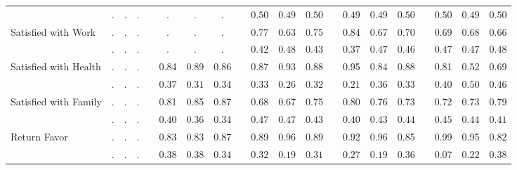 \begin{landscape}
\begin{center}
{\begin{longtable}{L{5cm} c c c p{.5cm} c c c p{.5cm} c c c p{.5cm} c c c p{.5cm} c c c}
& $\mathit{        .}$ & $\mathit{        .}$ & $\mathit{        .}$ & & $\mathit{        .}$ & $\mathit{        .}$ & $\mathit{        .}$ & & $\mathit{     0.50}$ & $\mathit{     0.49}$ & $\mathit{     0.50}$ & & $\mathit{     0.49}$ & $\mathit{     0.49}$ & $\mathit{     0.50}$ & & $\mathit{     0.50}$ & $\mathit{     0.49}$ & $\mathit{     0.50}$ \\[1.6em]
Satisfied with Work & . &         . &         . & &         . &         . &         . & &      0.77 &      0.63 &      0.75 & &      0.84 &      0.67 &      0.70 & &      0.69 &      0.68 &      0.66 \\*
& $\mathit{        .}$ & $\mathit{        .}$ & $\mathit{        .}$ & & $\mathit{        .}$ & $\mathit{        .}$ & $\mathit{        .}$ & & $\mathit{     0.42}$ & $\mathit{     0.48}$ & $\mathit{     0.43}$ & & $\mathit{     0.37}$ & $\mathit{     0.47}$ & $\mathit{     0.46}$ & & $\mathit{     0.47}$ & $\mathit{     0.47}$ & $\mathit{     0.48}$ \\[1.6em]
Satisfied with Health & . &         . &         . & &      0.84 &      0.89 &      0.86 & &      0.87 &      0.93 &      0.88 & &      0.95 &      0.84 &      0.88 & &      0.81 &      0.52 &      0.69 \\*
& $\mathit{        .}$ & $\mathit{        .}$ & $\mathit{        .}$ & & $\mathit{     0.37}$ & $\mathit{     0.31}$ & $\mathit{     0.34}$ & & $\mathit{     0.33}$ & $\mathit{     0.26}$ & $\mathit{     0.32}$ & & $\mathit{     0.21}$ & $\mathit{     0.36}$ & $\mathit{     0.33}$ & & $\mathit{     0.40}$ & $\mathit{     0.50}$ & $\mathit{     0.46}$ \\[1.6em]
Satisfied with Family & . &         . &         . & &      0.81 &      0.85 &      0.87 & &      0.68 &      0.67 &      0.75 & &      0.80 &      0.76 &      0.73 & &      0.72 &      0.73 &      0.79 \\*
& $\mathit{        .}$ & $\mathit{        .}$ & $\mathit{        .}$ & & $\mathit{     0.40}$ & $\mathit{     0.36}$ & $\mathit{     0.34}$ & & $\mathit{     0.47}$ & $\mathit{     0.47}$ & $\mathit{     0.43}$ & & $\mathit{     0.40}$ & $\mathit{     0.43}$ & $\mathit{     0.44}$ & & $\mathit{     0.45}$ & $\mathit{     0.44}$ & $\mathit{     0.41}$ \\[1.6em]
Return Favor & . &         . &         . & &      0.83 &      0.83 &      0.87 & &      0.89 &      0.96 &      0.89 & &      0.92 &      0.96 &      0.85 & &      0.99 &      0.95 &      0.82 \\*
& $\mathit{        .}$ & $\mathit{        .}$ & $\mathit{        .}$ & & $\mathit{     0.38}$ & $\mathit{     0.38}$ & $\mathit{     0.34}$ & & $\mathit{     0.32}$ & $\mathit{     0.19}$ & $\mathit{     0.31}$ & & $\mathit{     0.27}$ & $\mathit{     0.19}$ & $\mathit{     0.36}$ & & $\mathit{     0.07}$ & $\mathit{     0.22}$ & $\mathit{     0.38}$ \\[1.6em]

\end{longtable}}
\end{center}
\end{landscape}
